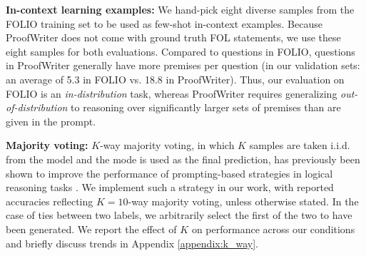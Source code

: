 \documentclass[11pt]{article}
\newcommand{\txo}[1]{\textcolor{blue}{}}
\newcommand{\txo}[1]{\textcolor{blue}{\bf\small [TXO: #1]}}
\newcommand{\TODO}{\textcolor{red}{\textbf{TODO}}}
\begin{document}




\textbf{In-context learning examples:} We hand-pick eight diverse samples from the FOLIO training set to be used as few-shot in-context examples. Because ProofWriter does not come with ground truth FOL statements, we use these eight samples for both evaluations. Compared to questions in FOLIO, questions in ProofWriter generally have more premises per question (in our validation sets: an average of 5.3 in FOLIO vs. 18.8 in ProofWriter).
Thus, our evaluation on FOLIO is an \emph{in-distribution} task, whereas ProofWriter requires generalizing \emph{out-of-distribution} to reasoning over significantly larger sets of premises than are given in the prompt.

\textbf{Majority voting:} $K$-way majority voting, in which $K$ samples are taken i.i.d. from the model and the mode is used as the final prediction, has previously been shown to improve the performance of prompting-based strategies in logical reasoning tasks \cite{wang2022self}.
We implement such a strategy in our work, with reported accuracies reflecting $K=10$-way majority voting, unless otherwise stated.
In the case of ties between two labels, we arbitrarily select the first of the two to have been generated.
We report the effect of $K$ on performance across our conditions and briefly discuss trends in Appendix \ref{appendix:k_way}.

\end{document}
